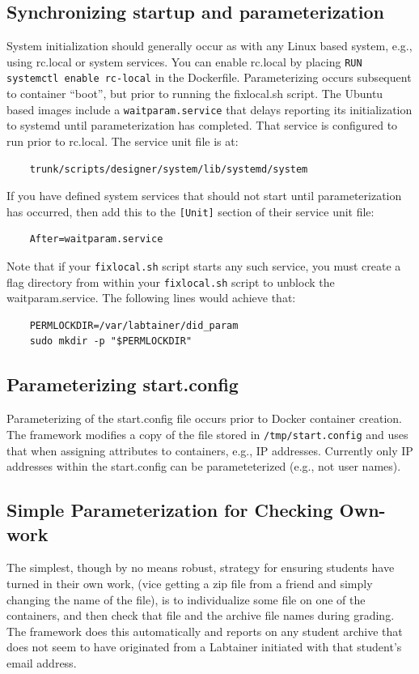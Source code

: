 \documentclass[12pt]{article}
\begin{document}
\subsection{Synchronizing startup and parameterization}
System initialization should generally occur as with any Linux based system, e.g., using rc.local
or system services.
You can enable rc.local by placing {\tt RUN systemctl enable rc-local} in the Dockerfile.
Parameterizing occurs subsequent to container ``boot'', but prior to running the fixlocal.sh script.
The Ubuntu based images include a {\tt waitparam.service} that delays reporting its initialization to
systemd until parameterization has completed.  That service is configured to run prior to rc.local.
The service unit file is at:
\begin{verbatim}
    trunk/scripts/designer/system/lib/systemd/system
\end{verbatim}
If you have defined system services that should not start until parameterization has occurred, then
add this to the {\tt[Unit]} section of their service unit file:
\begin{verbatim}
    After=waitparam.service
\end{verbatim}
\noindent Note that if your {\tt fixlocal.sh} script starts any such service, you must create a flag
directory from within your {\tt fixlocal.sh} script to unblock the waitparam.service.  The following
lines would achieve that:
\begin{verbatim}
    PERMLOCKDIR=/var/labtainer/did_param
    sudo mkdir -p "$PERMLOCKDIR"
\end{verbatim}

\subsection{Parameterizing start.config}
Parameterizing of the start.config file occurs prior to Docker container creation.  The framework 
modifies a copy of the file stored in {\tt /tmp/start.config} and uses that when assigning attributes to containers,
e.g., IP addresses. Currently only IP addresses within the start.config can be parameteterized (e.g., not user names).

\subsection{Simple Parameterization for Checking Own-work}
The simplest, though by no means robust, strategy for ensuring students
have turned in their own work, (vice getting a zip file from a friend and simply
changing the name of the file), is to individualize some file on one of the containers,
and then check that file and the archive file names during grading.  The framework does
this automatically and reports on any student archive that does not seem to have
originated from a Labtainer initiated with that student's email address.
\end{document}
